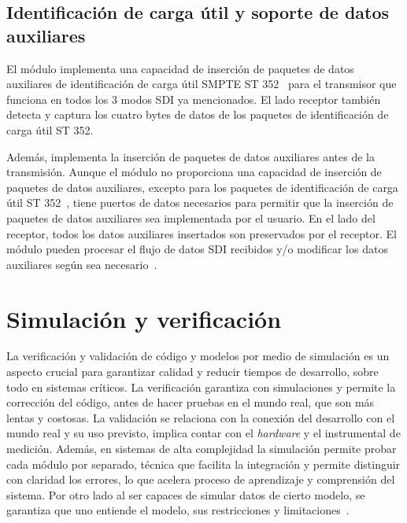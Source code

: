   \subsection{Identificación de carga útil y soporte de datos auxiliares}

  El módulo implementa una capacidad de inserción de paquetes de datos auxiliares
  de identificación de carga útil SMPTE ST 352~\citep{st352} para el transmisor que funciona en
  todos los 3 modos SDI ya mencionados. El lado receptor también detecta y captura
  los cuatro bytes de datos de los paquetes de identificación de carga útil ST 352.

  Además, implementa la inserción de paquetes de datos auxiliares antes de la
  transmisión. Aunque el módulo no proporciona una capacidad de inserción de paquetes
  de datos auxiliares, excepto para los paquetes de identificación de carga útil
  ST 352~\citep{st352}, tiene puertos de datos necesarios para permitir que la inserción de
  paquetes de datos auxiliares sea implementada por el usuario. En el lado del
  receptor, todos los datos auxiliares insertados son preservados por el receptor.
  El módulo pueden procesar el flujo de datos SDI recibidos y/o modificar los datos
  auxiliares según sea necesario~\citep{design}.

\section{Simulación y verificación}

La verificación y validación de código y modelos por medio de simulación es
un aspecto crucial para garantizar calidad y reducir tiempos de desarrollo,
sobre todo en sistemas críticos. La verificación garantiza con simulaciones y
permite la corrección del código, antes de hacer pruebas en el mundo real, que
son más lentas y costosas. La validación se relaciona con la conexión del
desarrollo con el mundo real y su uso previsto, implica contar con el
\textit{hardware} y el instrumental de medición. Además, en sistemas de alta
complejidad la simulación permite probar cada módulo por separado, técnica que
facilita la integración y permite distinguir con claridad los errores, lo que
acelera proceso de aprendizaje y comprensión del sistema. Por otro lado al ser
capaces de simular datos de cierto modelo, se garantiza que uno entiende el
modelo, sus restricciones y limitaciones~\citep{testbench}.

